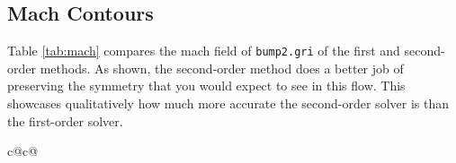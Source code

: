 \documentclass{article}
\begin{document}
\subsection{Mach Contours}
Table \ref{tab:mach} compares the mach field of \texttt{bump2.gri} of the first and second-order methods.
As shown, the second-order method does a better job of preserving the symmetry that you would expect to see in this flow.
This showcases qualitatively how much more accurate the second-order solver is than the first-order solver.
\begin{table}[ht]
	\begin{center}
	\begin{tabular}{ c@{}c@{} }


		\hline
		\\


		\hline
		\\

		\hline
		\\

		\hline
		\\
		\vspace{0.25mm}\\
	\end{tabular}
	\caption{\texttt{bump2.gri} mach contours for each method}
	\label{tab:mach}
	\vspace*{-3mm}
	\end{center}
\end{table}


% 
\end{document}
